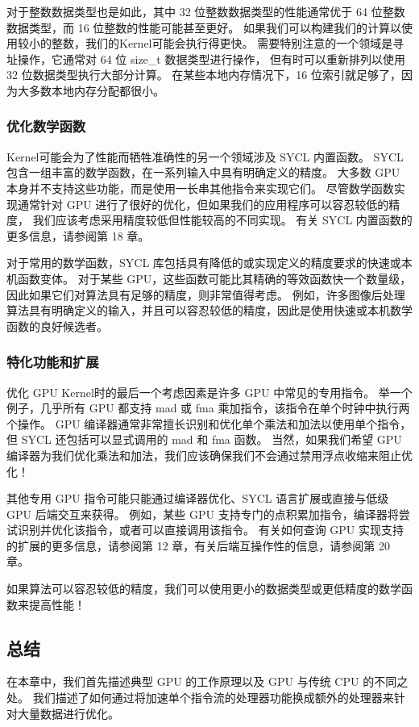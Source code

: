 对于整数数据类型也是如此，其中 32 位整数数据类型的性能通常优于 64 位整数数据类型，而 16 位整数的性能可能甚至更好。 
如果我们可以构建我们的计算以使用较小的整数，我们的Kernel可能会执行得更快。 
需要特别注意的一个领域是寻址操作，它通常对 64 位 size\_t 数据类型进行操作，
但有时可以重新排列以使用 32 位数据类型执行大部分计算。 
在某些本地内存情况下，16 位索引就足够了，因为大多数本地内存分配都很小。

\subsubsection{优化数学函数}
Kernel可能会为了性能而牺牲准确性的另一个领域涉及 SYCL 内置函数。 
SYCL 包含一组丰富的数学函数，在一系列输入中具有明确定义的精度。 
大多数 GPU 本身并不支持这些功能，而是使用一长串其他指令来实现它们。 
尽管数学函数实现通常针对 GPU 进行了很好的优化，但如果我们的应用程序可以容忍较低的精度，
我们应该考虑采用精度较低但性能较高的不同实现。 有关 SYCL 内置函数的更多信息，请参阅第 18 章。

对于常用的数学函数，SYCL 库包括具有降低的或实现定义的精度要求的快速或本机函数变体。 
对于某些 GPU，这些函数可能比其精确的等效函数快一个数量级，因此如果它们对算法具有足够的精度，则非常值得考虑。 
例如，许多图像后处理算法具有明确定义的输入，并且可以容忍较低的精度，因此是使用快速或本机数学函数的良好候选者。

\subsubsection{特化功能和扩展}
优化 GPU Kernel时的最后一个考虑因素是许多 GPU 中常见的专用指令。 
举一个例子，几乎所有 GPU 都支持 mad 或 fma 乘加指令，该指令在单个时钟中执行两个操作。 
GPU 编译器通常非常擅长识别和优化单个乘法和加法以使用单个指令，但 SYCL 还包括可以显式调用的 mad 和 fma 函数。 
当然，如果我们希望 GPU 编译器为我们优化乘法和加法，我们应该确保我们不会通过禁用浮点收缩来阻止优化！

其他专用 GPU 指令可能只能通过编译器优化、SYCL 语言扩展或直接与低级 GPU 后端交互来获得。 
例如，某些 GPU 支持专门的点积累加指令，编译器将尝试识别并优化该指令，或者可以直接调用该指令。 
有关如何查询 GPU 实现支持的扩展的更多信息，请参阅第 12 章，有关后端互操作性的信息，请参阅第 20 章。

\begin{remark}
	如果算法可以容忍较低的精度，我们可以使用更小的数据类型或更低精度的数学函数来提高性能！
\end{remark}

\subsection{总结}
在本章中，我们首先描述典型 GPU 的工作原理以及 GPU 与传统 CPU 的不同之处。 
我们描述了如何通过将加速单个指令流的处理器功能换成额外的处理器来针对大量数据进行优化。

